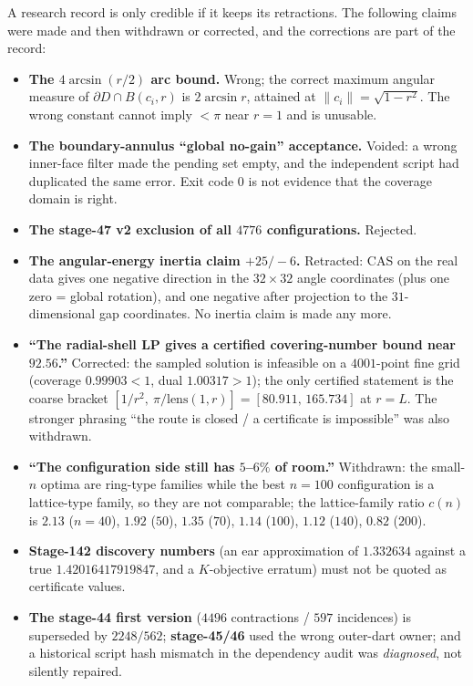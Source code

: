A research record is only credible if it keeps its retractions. The following claims were made and
then withdrawn or corrected, and the corrections are part of the record:

\begin{itemize}[leftmargin=1.4em,itemsep=3pt]
\item \textbf{The $4\arcsin(r/2)$ arc bound.} Wrong; the correct maximum angular measure of
$\partial D\cap B(c_i,r)$ is $2\arcsin r$, attained at $\|c_i\|=\sqrt{1-r^2}$. The wrong constant
cannot imply $<\!\pi$ near $r=1$ and is unusable.
\item \textbf{The boundary-annulus ``global no-gain'' acceptance.} Voided: a wrong inner-face filter
made the pending set empty, and the independent script had duplicated the same error. Exit code $0$
is not evidence that the coverage domain is right.
\item \textbf{The stage-47 v2 exclusion of all $4776$ configurations.} Rejected.
\item \textbf{The angular-energy inertia claim $+25/-6$.} Retracted: CAS on the real data gives one
negative direction in the $32\times32$ angle coordinates (plus one zero = global rotation), and one
negative after projection to the $31$-dimensional gap coordinates. No inertia claim is made any more.
\item \textbf{``The radial-shell LP gives a certified covering-number bound near $92.56$.''}
Corrected: the sampled solution is infeasible on a $4001$-point fine grid (coverage $0.99903<1$,
dual $1.00317>1$); the only certified statement is the coarse bracket
$[1/r^2,\ \pi/\mathrm{lens}(1,r)]=[80.911,\,165.734]$ at $r=L$. The stronger phrasing ``the route is
closed / a certificate is impossible'' was also withdrawn.
\item \textbf{``The configuration side still has $5$--$6\%$ of room.''} Withdrawn: the small-$n$
optima are ring-type families while the best $n=100$ configuration is a lattice-type family, so they
are not comparable; the lattice-family ratio $c(n)$ is $2.13$ ($n=40$), $1.92$ ($50$), $1.35$ ($70$),
$1.14$ ($100$), $1.12$ ($140$), $0.82$ ($200$).
\item \textbf{Stage-142 discovery numbers} (an ear approximation of $1.332634$ against a true
$1.42016417919847$, and a $K$-objective erratum) must not be quoted as certificate values.
\item \textbf{The stage-44 first version} ($4496$ contractions / $597$ incidences) is superseded by
$2248/562$; \textbf{stage-45/46} used the wrong outer-dart owner; and a historical script hash
mismatch in the dependency audit was \emph{diagnosed}, not silently repaired.
\end{itemize}

